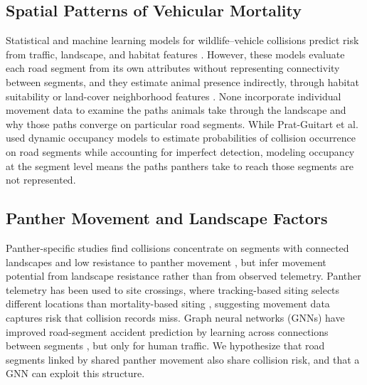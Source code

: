 \documentclass[letterpaper]{article}
\begin{document}
\subsection{Spatial Patterns of Vehicular Mortality}
Statistical and machine learning models for wildlife–vehicle collisions predict risk from traffic, landscape, and habitat features \cite{pagany2022spatiotemporal,laube2023analysing,Visintin2016,Bell2024}. However, these models evaluate each road segment from its own attributes without representing connectivity between segments, and they estimate animal presence indirectly, through habitat suitability \cite{Visintin2016} or land-cover neighborhood features \cite{laube2023analysing}. None incorporate individual movement data to examine the paths animals take through the landscape and why those paths converge on particular road segments. While Prat-Guitart et al.  used dynamic occupancy models to estimate probabilities of collision occurrence on road segments while accounting for imperfect detection, modeling occupancy at the segment level means the paths panthers take to reach those segments are not represented.

\subsection{Panther Movement and Landscape Factors}
Panther-specific studies find collisions concentrate on segments with connected landscapes and low resistance to panther movement \cite{Schwab2011,USFWS2019Hotspots,PratGuitart2026}, but infer movement potential from landscape resistance rather than from observed telemetry. Panther telemetry has been used to site crossings, where tracking-based siting selects different locations than mortality-based siting \cite{Loraamm2016,Downs2014}, suggesting movement data captures risk that collision records miss. Graph neural networks (GNNs) have improved road-segment accident prediction by learning across connections between segments \cite{Nippani2023,Yu2021}, but only for human traffic. We hypothesize that road segments linked by shared panther movement also share collision risk, and that a GNN can exploit this structure.
\end{document}
